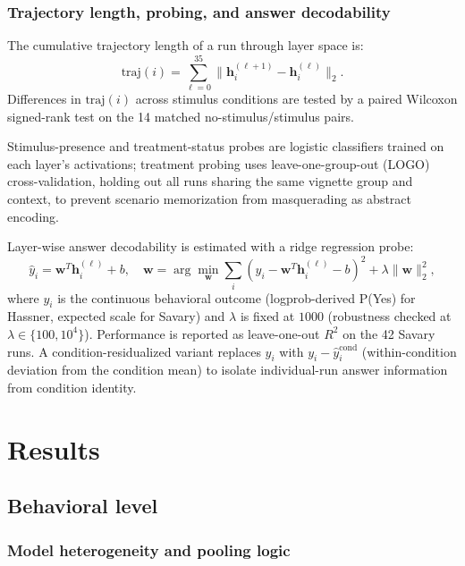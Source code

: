 \documentclass[14pt,a4paper]{extarticle}
\begin{document}
\subsubsection*{Trajectory length, probing, and answer decodability}

The cumulative trajectory length of a run through layer space is:
\begin{equation}
\mathrm{traj}(i) = \sum_{\ell=0}^{35} \|\mathbf{h}^{(\ell+1)}_i - \mathbf{h}^{(\ell)}_i\|_2.
\label{eq:traj}
\end{equation}
Differences in $\mathrm{traj}(i)$ across stimulus conditions are tested by a paired Wilcoxon signed-rank test on the 14 matched no-stimulus/stimulus pairs.

Stimulus-presence and treatment-status probes are logistic classifiers trained on each layer's activations; treatment probing uses leave-one-group-out (LOGO) cross-validation, holding out all runs sharing the same vignette group and context, to prevent scenario memorization from masquerading as abstract encoding.

Layer-wise answer decodability is estimated with a ridge regression probe:
\begin{equation}
\hat{y}_i = \mathbf{w}^T \mathbf{h}^{(\ell)}_i + b, \quad \mathbf{w} = \arg\min_{\mathbf{w}} \sum_i (y_i - \mathbf{w}^T \mathbf{h}^{(\ell)}_i - b)^2 + \lambda \|\mathbf{w}\|_2^2,
\label{eq:ridge}
\end{equation}
where $y_i$ is the continuous behavioral outcome (logprob-derived P(Yes) for Hassner, expected scale for Savary) and $\lambda$ is fixed at $1000$ (robustness checked at $\lambda \in \{100, 10^4\}$). Performance is reported as leave-one-out $R^2$ on the 42 Savary runs. A condition-residualized variant replaces $y_i$ with $y_i - \hat{y}^{\mathrm{cond}}_i$ (within-condition deviation from the condition mean) to isolate individual-run answer information from condition identity.


\section{Results}

\subsection{Behavioral level}

\subsubsection{Model heterogeneity and pooling logic}
\end{document}

